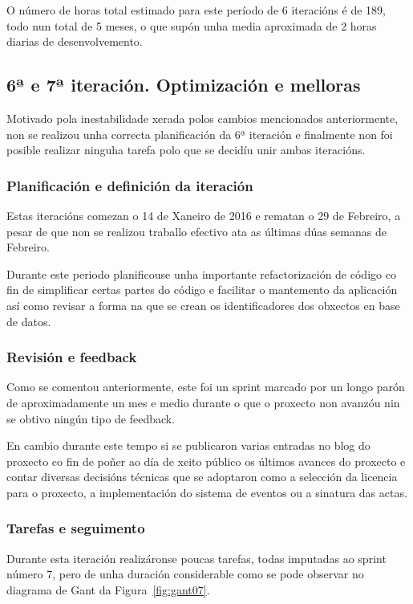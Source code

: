   O número de horas total estimado para este período de 6 iteracións é de 189, 
todo nun total de 5 meses, o que supón unha media aproximada de 2 horas 
diarias de desenvolvemento.

    \subsection{6ª e 7ª iteración. Optimización e melloras}
    Motivado pola inestabilidade xerada polos cambios mencionados anteriormente,
non se realizou unha correcta planificación da 6ª iteración e finalmente non 
foi posible realizar ninguha tarefa polo que se decidíu unir ambas iteracións.

      \subsubsection{Planificación e definición da iteración}
      Estas iteracións comezan o 14 de Xaneiro de 2016 e rematan o 29 de 
Febreiro, a pesar de que non se realizou traballo efectivo ata as últimas dúas 
semanas de Febreiro.

      Durante este periodo planificouse unha importante refactorización de 
código co fin de simplificar certas partes do código e facilitar o mantemento 
da aplicación así como revisar a forma na que se crean os identificadores dos 
obxectos en base de datos.

      \subsubsection{Revisión e feedback}
      Como se comentou anteriormente, este foi un sprint marcado por un longo 
parón de aproximadamente un mes e medio durante o que o proxecto non avanzóu 
nin se obtivo ningún tipo de feedback.

      En cambio durante este tempo si se publicaron varias entradas no blog do 
proxecto co fin de poñer ao día de xeito público os últimos avances do proxecto 
e contar diversas decisións técnicas que se adoptaron como a selección da 
licencia para o proxecto, a implementación do sistema de eventos ou a sinatura 
das actas.

      \subsubsection{Tarefas e seguimento}

      Durante esta iteración realizáronse poucas tarefas, todas imputadas ao 
sprint número 7, pero de unha duración considerable como se pode observar no 
diagrama de Gant da Figura~\ref{fig:gant07}.

